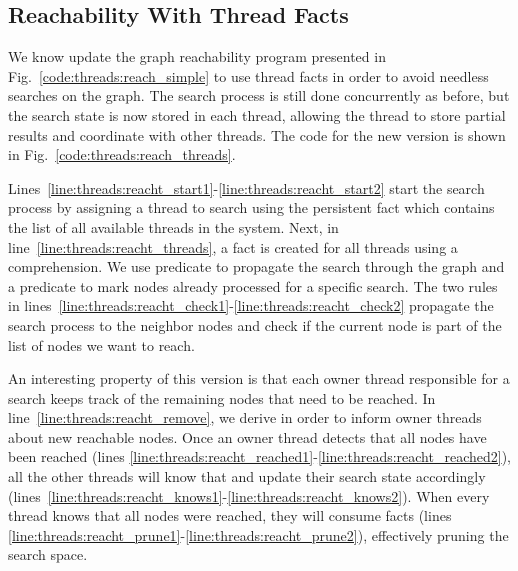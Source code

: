 \subsection{Reachability With Thread Facts}

We know update the graph reachability program presented in
Fig.~\ref{code:threads:reach_simple} to use thread facts in order to avoid
needless searches on the graph. The search process is still done concurrently as
before, but the search state is now stored in each thread, allowing the thread
to store partial results and coordinate with other threads. The code for the new
version is shown in Fig.~\ref{code:threads:reach_threads}.

Lines~\ref{line:threads:reacht_start1}-\ref{line:threads:reacht_start2} start
the search process by assigning a thread  to search  using
the persistent fact  which contains the list of all
available threads in the system. Next, in
line~\ref{line:threads:reacht_threads}, a fact  is created
for all threads using a comprehension. We use predicate  to
propagate the search through the graph and a predicate  to mark
nodes already processed for a specific search.  The two rules in
lines~\ref{line:threads:reacht_check1}-\ref{line:threads:reacht_check2}
propagate the search process to the neighbor nodes and check if the current node
is part of the list of nodes we want to reach.

An interesting property of this version is that each owner thread responsible
for a search keeps track of the remaining nodes that need to be reached. In
line~\ref{line:threads:reacht_remove}, we derive  in
order to inform owner threads about new reachable nodes. Once an owner thread
detects that all nodes have been reached (lines
\ref{line:threads:reacht_reached1}-\ref{line:threads:reacht_reached2}), all the
other threads will know that and update their search state accordingly
(lines~\ref{line:threads:reacht_knows1}-\ref{line:threads:reacht_knows2}). When
every thread knows that all nodes were reached, they will consume
 facts (lines
\ref{line:threads:reacht_prune1}-\ref{line:threads:reacht_prune2}), effectively
pruning the search space.

